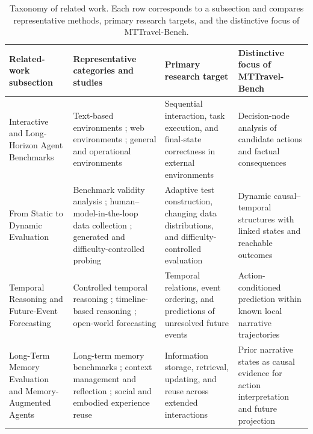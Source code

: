 \documentclass[pdflatex,sn-mathphys-num]{sn-jnl}%
\theoremstyle{thmstyleone}%
\theoremstyle{thmstyletwo}%
\theoremstyle{thmstylethree}%
\begin{document}
\begin{table}
\centering
\scriptsize
\caption{Taxonomy of related work. Each row corresponds to a subsection and compares representative methods, primary research targets, and the distinctive focus of MTTravel-Bench.}
\label{tab:related-work-map}
\begin{tabular}{p{} p{} p{} p{}}
\toprule
Related-work subsection & Representative categories and studies & Primary research target & Distinctive focus of MTTravel-Bench \\
\midrule
Interactive and Long-Horizon Agent Benchmarks & Text-based environments \cite{cote2018textworld,hausknecht2019interactive,shridhar2020alfworld}; web environments \cite{yao2022webshop,deng2023mind2web,zhou2023webarena}; general and operational environments \cite{liu2023agentbench,xie2024osworld,trivedi2024appworld,yao2024bench,lu2024toolsandbox,xu2024theagentcompany} & Sequential interaction, task execution, and final-state correctness in external environments & Decision-node analysis of candidate actions and factual consequences \\
\midrule
From Static to Dynamic Evaluation & Benchmark validity analysis \cite{bowman2021take}; human--model-in-the-loop data collection \cite{kiela2021dynabench}; generated and difficulty-controlled probing \cite{hu2025dynacode,zhu2024dynamic} & Adaptive test construction, changing data distributions, and difficulty-controlled evaluation & Dynamic causal--temporal structures with linked states and reachable outcomes \\
\midrule
Temporal Reasoning and Future-Event Forecasting & Controlled temporal reasoning \cite{fatemi2024test,uddin2024unseentimeqa}; timeline-based reasoning \cite{tan2023timelineqa,wei2025time}; open-world forecasting \cite{zou2022forecasting,karger2024forecastbench,halawi2024approaching} & Temporal relations, event ordering, and predictions of unresolved future events & Action-conditioned prediction within known local narrative trajectories \\
\midrule
Long-Term Memory Evaluation and Memory-Augmented Agents & Long-term memory benchmarks \cite{wu2024longmemeval,hu2025evaluating}; context management and reflection \cite{packer2023memgpt,shinn2023reflexion}; social and embodied experience reuse \cite{park2023generative,wang2023voyager} & Information storage, retrieval, updating, and reuse across extended interactions & Prior narrative states as causal evidence for action interpretation and future projection \\

\end{tabular}
\end{table}
\end{document}

